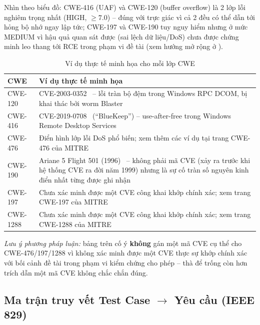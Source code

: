 Nhìn theo biểu đồ: CWE-416 (UAF) và CWE-120 (buffer overflow) là 2 lớp lỗi nghiêm trọng nhất (HIGH, $\geq 7.0$) -- đúng với trực giác vì cả 2 đều có thể dẫn tới hỏng bộ nhớ ngay lập tức; CWE-197 và CWE-190 tuy nguy hiểm nhưng ở mức MEDIUM vì hậu quả quan sát được (sai lệch dữ liệu/DoS) chưa được chứng minh leo thang tới RCE trong phạm vi đề tài (xem hướng mở rộng ở ).

\begin{table}[H]
  \centering
  \caption{Ví dụ thực tế minh họa cho mỗi lớp CWE}
  \label{tab:cwe-examples}
  \small
  \begin{tabularx}{\linewidth}{@{}l X@{}}
    \toprule
    \textbf{CWE} & \textbf{Ví dụ thực tế minh họa} \\
    \midrule
    CWE-120  & CVE-2003-0352~\cite{cve2003-0352} -- lỗi tràn bộ đệm trong Windows RPC DCOM, bị khai thác bởi worm Blaster \\
    CWE-416  & CVE-2019-0708~\cite{cve2019-0708} (``BlueKeep'') -- use-after-free trong Windows Remote Desktop Services \\
    CWE-476  & Điển hình lớp lỗi DoS phổ biến; xem thêm các ví dụ tại trang CWE-476 của MITRE~\cite{cwe476} \\
    CWE-190  & Ariane 5 Flight 501 (1996)~\cite{ariane5report} -- không phải mã CVE (xảy ra trước khi hệ thống CVE ra đời năm 1999) nhưng là sự cố tràn số nguyên kinh điển nhất từng được ghi nhận \\
    CWE-197  & Chưa xác minh được một CVE công khai khớp chính xác; xem trang CWE-197 của MITRE~\cite{cwe197} \\
    CWE-1288 & Chưa xác minh được một CVE công khai khớp chính xác; xem trang CWE-1288 của MITRE~\cite{cwe1288} \\
    \bottomrule
  \end{tabularx}
\end{table}

\noindent\textit{Lưu ý phương pháp luận:} bảng trên cố ý \textbf{không} gán một mã CVE cụ thể cho CWE-476/197/1288 vì không xác minh được một CVE thực sự khớp chính xác với bối cảnh đề tài trong phạm vi kiểm chứng cho phép -- thà để trống còn hơn trích dẫn một mã CVE không chắc chắn đúng.

\subsection{Ma trận truy vết Test Case $\to$ Yêu cầu (IEEE 829)}
\label{sec:traceability}

